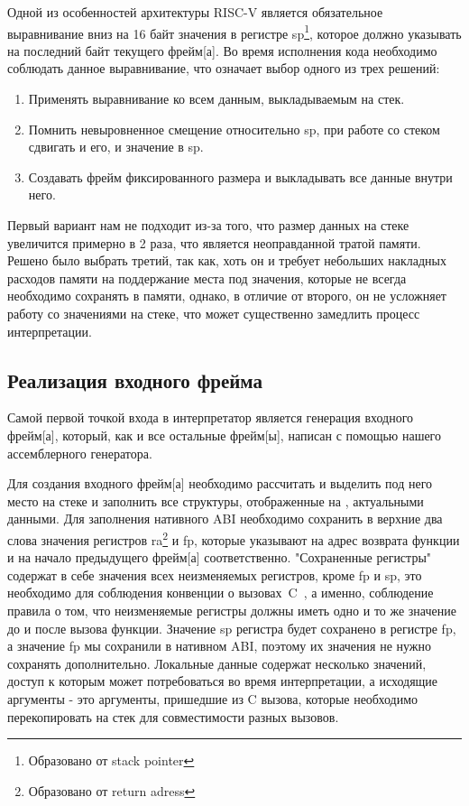     Одной из особенностей архитектуры RISC-V является обязательное выравнивание вниз на 16 байт значения в регистре sp\footnote{Образовано от stack pointer}, которое должно указывать на последний байт текущего \gls{фрейм}[а]. Во время исполнения кода необходимо соблюдать данное выравнивание, что означает выбор одного из трех решений:
\begin{enumerate}
    \item Применять выравнивание ко всем данным, выкладываемым на стек.
    \item Помнить невыровненное смещение относительно sp, при работе со стеком сдвигать и его, и значение в sp.
    \item Создавать \gls{фрейм} фиксированного размера и выкладывать все данные внутри него.
\end{enumerate}

Первый вариант нам не подходит из-за того, что размер данных на стеке увеличится примерно в 2 раза, что является неоправданной тратой памяти. Решено было выбрать третий, так как, хоть он и требует небольших накладных расходов памяти на поддержание места под значения, которые не всегда необходимо сохранять в памяти, однако, в отличие от второго, он не усложняет работу со значениями на стеке, что может существенно замедлить процесс интерпретации.

\subsection{Реализация входного фрейма}

Самой первой точкой входа в интерпретатор является генерация входного \gls{фрейм}[а], который, как и все остальные \gls{фрейм}[ы], написан с помощью нашего ассемблерного генератора. 

Для создания входного \gls{фрейм}[а] необходимо рассчитать и выделить под него место на стеке и заполнить все структуры, отображенные на , актуальными данными. Для заполнения нативного ABI необходимо сохранить в верхние два слова значения регистров ra\footnote{Образовано от return adress} и fp, которые указывают на адрес возврата функции и на начало предыдущего \gls{фрейм}[а] соответственно. "Сохраненные регистры" содержат в себе значения всех неизменяемых регистров, кроме fp и sp, это необходимо для соблюдения конвенции о вызовах~C~\cite{riscv:convention}, а именно, соблюдение правила о том, что неизменяемые регистры должны иметь одно и то же значение до и после вызова функции. Значение sp регистра будет сохранено в регистре fp, а значение fp мы сохранили в нативном ABI, поэтому их значения не нужно сохранять дополнительно. Локальные данные содержат несколько значений, доступ к которым может потребоваться во время интерпретации, а исходящие аргументы - это аргументы, пришедшие из C вызова, которые необходимо перекопировать на стек для совместимости разных вызовов.
 
